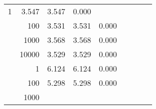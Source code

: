 \begin{table}
\begin{tabular}{rrrrrrrrr}
					
					 
					\multirow{ 1 }{*}{ 1 } &
					
						
							    
							    
	                           3.547 & 3.547 & 0.000  \\
	                
	            
					 &  
					 
					\multirow{ 1 }{*}{ 100 } &
					
						
							    
							    
	                           3.531 & 3.531 & 0.000  \\
	                
	            
					 &  
					 
					\multirow{ 1 }{*}{ 1000 } &
					
						
							    
							    
	                           3.568 & 3.568 & 0.000  \\
	                
	            
					 &  
					 
					\multirow{ 1 }{*}{ 10000 } &
					
						
							    
							    
	                           3.529 & 3.529 & 0.000  \\
	                
	            
	        
				\noalign{\smallskip}\hline
				\multirow{ 4 }{*}{ 1000000 } &
				
					
					 
					\multirow{ 1 }{*}{ 1 } &
					
						
							    
							    
	                           6.124 & 6.124 & 0.000  \\
	                
	            
					 &  
					 
					\multirow{ 1 }{*}{ 100 } &
					
						
							    
							    
	                           5.298 & 5.298 & 0.000  \\
	                
	            
					 &  
					 
					\multirow{ 1 }{*}{ 1000 } &
					

\end{tabular}
\end{table}
